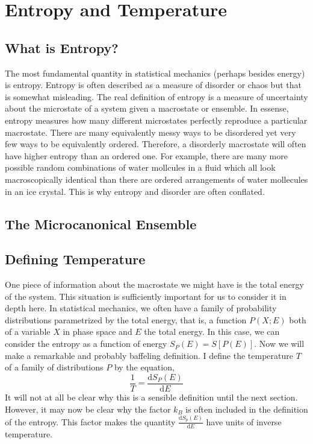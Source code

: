 \documentclass[11pt,a4paper]{article}
\renewcommand{\d}[1]{\mathrm{d}#1}
\newcommand{\deriv}[2]{\frac{\d{#1}}{\d{#2}}}
\theoremstyle{theorem}
\theoremstyle{definition}
\theoremstyle{definition}
\theoremstyle{remark}
\theoremstyle{definition}
\theoremstyle{remark}
\begin{document}
\section{Entropy and Temperature}

\subsection{What is Entropy?}

The most fundamental quantity in statistical mechanics (perhaps besides energy) is entropy. Entropy is often described as a measure of disorder or chaos but that is somewhat misleading. The real definition of entropy is a measure of uncertainty about the microstate of a system given a macrostate or ensemble. In essense, entropy measures how many different microstates perfectly reproduce a particular macrostate. There are many equivalently messy ways to be disordered yet very few ways to be equivalently ordered. Therefore, a disorderly macrostate will often have higher entropy than an ordered one. For example, there are many more possible random combinations of water mollcules in a fluid which all look macroscopically identical than there are ordered arrangements of water mollecules in an ice crystal. This is why entropy and disorder are often conflated. 

\subsection{The Microcanonical Ensemble}



\subsection{Defining Temperature}

One piece of information about the macrostate we might have is the total energy of the system. This situation is sufficiently important for us to consider it in depth here. In statistical mechanics, we often have a family of probability distributions parametrized by the total energy, that is, a function $P(X;E)$ both of a variable $X$ in phase space and $E$ the total energy. In this case, we can consider the entropy as a function of energy $S_P(E) = S[P(E)]$. Now we will make a remarkable and probably baffeling definition. I define the temperature $T$ of a family of distributions $P$ by the equation,
\[ \frac{1}{T} = \deriv{S_P(E)}{E} \]
It will not at all be clear why this is a sensible definition until the next section. However, it may now be clear why the factor $k_B$ is often included in the definition of the entropy. This factor makes the quantity $\deriv{S_p(E)}{E}$ have units of inverse temperature.
\end{document}
